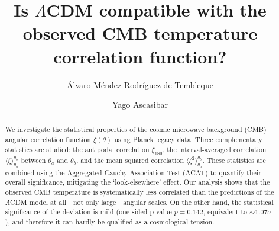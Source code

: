 \documentclass[apj,twocolumn,numberedappendix]{openjournal}
\begin{document}

\title[%
CMB Correlation Statistics]
{Is $\Lambda$CDM compatible with the observed CMB temperature correlation function?}

\author{\'Alvaro M\'endez Rodr\'iguez de Tembleque}

\author{Yago Ascasibar}

\begin{abstract}
We investigate the statistical properties of the cosmic microwave background (CMB) angular correlation function $\xi(\theta)$ using Planck legacy data.
Three complementary statistics are studied:
the antipodal correlation $\xi_{180}$,
the interval-averaged correlation $\langle\xi\rangle_{\theta_a}^{\theta_b}$  between $\theta_a$ and $\theta_b$,
and the mean squared correlation $\langle\xi^2\rangle_{\theta_a}^{\theta_b}$.
These statistics are combined using the Aggregated Cauchy Association Test (ACAT) to quantify their overall significance, mitigating the `look-elsewhere' effect.
Our analysis shows that the observed CMB temperature is systematically less correlated than the predictions of the $\Lambda$CDM model at all---not only large---angular scales.
On the other hand, the statistical significance of the deviation is mild (one-sided p-value $p = 0.142$, equivalent to $\sim 1.07 \sigma$), and therefore it can hardly be qualified as a cosmological tension.
\end{abstract}


\maketitle
\end{document}

